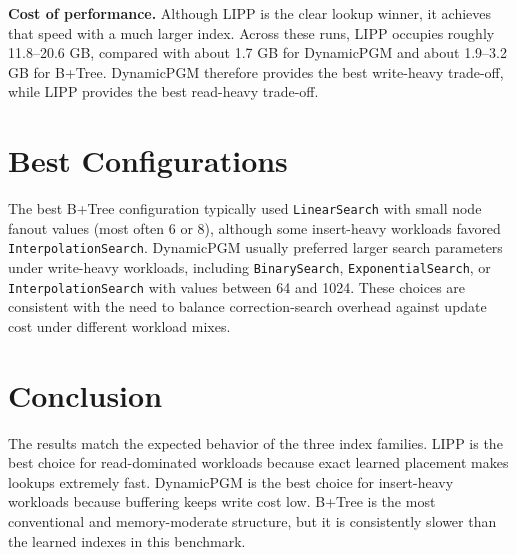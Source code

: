 \documentclass{MITcsail}
\begin{document}
\textbf{Cost of performance.} Although LIPP is the clear lookup winner, it achieves that speed with a much larger index. Across these runs, LIPP occupies roughly 11.8--20.6 GB, compared with about 1.7 GB for DynamicPGM and about 1.9--3.2 GB for B+Tree. DynamicPGM therefore provides the best write-heavy trade-off, while LIPP provides the best read-heavy trade-off.

\section{Best Configurations}
The best B+Tree configuration typically used \texttt{LinearSearch} with small node fanout values (most often 6 or 8), although some insert-heavy workloads favored \texttt{InterpolationSearch}. DynamicPGM usually preferred larger search parameters under write-heavy workloads, including \texttt{BinarySearch}, \texttt{ExponentialSearch}, or \texttt{InterpolationSearch} with values between 64 and 1024. These choices are consistent with the need to balance correction-search overhead against update cost under different workload mixes.

\section{Conclusion}
The results match the expected behavior of the three index families. LIPP is the best choice for read-dominated workloads because exact learned placement makes lookups extremely fast. DynamicPGM is the best choice for insert-heavy workloads because buffering keeps write cost low. B+Tree is the most conventional and memory-moderate structure, but it is consistently slower than the learned indexes in this benchmark.
\end{document}

